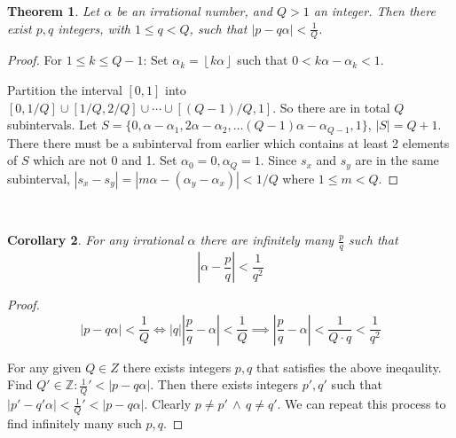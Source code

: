 \documentclass{article}
\newtheorem{thm}{Theorem}
\newtheorem{corollary}[thm]{Corollary}
\theoremstyle{definition}\newtheorem{definition}{Definition}
\begin{document}
	\begin{thm}
		Let $\alpha$ be an irrational number, and $Q > 1$ an integer. Then there exist $p , q$ integers, with $1 \leq q < Q$, such that $| p - q \alpha | < \frac { 1 } { Q }$.
	\end{thm}
	
	\begin{proof}
		For $ 1\leq k \leq Q-1$: Set $\alpha_{k}=\left\lfloor k\alpha \right\rfloor$ such that $0 < k\alpha - \alpha_{k} < 1.$
		
		Partition the interval $[0,1]$ into $[0,1/Q] \cup [1/Q, 2/Q] \cup \cdots \cup [(Q-1)/Q, 1]$. So there are in total $Q$ subintervals. Let $S=\{0, \alpha - \alpha_{1}, 2\alpha - \alpha_{2}, \ldots (Q-1)\alpha - \alpha_{Q-1} ,1\}$, $|S|=Q+1$. There there must be a subinterval from earlier which contains at least 2 elements of $S$ which are not 0 and 1. Set $\alpha_0=0, \alpha_Q=1$. Since $s_x$ and $s_y$ are in the same subinterval, $|s_x-s_y|=|m\alpha-(\alpha_y-\alpha_x)| < 1/Q$ where $1 \leq m < Q$.
	\end{proof}	
	
	\
	\begin{corollary} \label{corollary}
		For any irrational $\alpha$ there are infinitely many $\frac { p } { q }$ such that 
		$$\left| \alpha - \frac { p } { q } \right| < \frac { 1 } { q ^ { 2 } }$$
	\end{corollary}	
	
	\begin{proof}
		$$
		| p - q \alpha | < \frac { 1 } { Q } \iff |q| | \frac{p}{q} - \alpha | < \frac { 1 } { Q } \implies | \frac{p}{q} - \alpha | < \frac { 1 } { Q\cdot q } < \frac { 1 } { q ^ { 2 } }
		$$
		
		For any given $Q\in Z$ there exists integers $p, q$ that satisfies the above ineqaulity. Find $Q' \in \mathbb Z : \frac 1 Q' < | p- q\alpha |$. Then there exists integers $p' , q'$ such that $| p'- q'\alpha | < \frac 1 Q' < | p- q\alpha |$. Clearly $p \neq p' \, \land \, q \neq q'$. We can repeat this process to find infinitely many such $p, q$.
	\end{proof}
	
\end{document}
